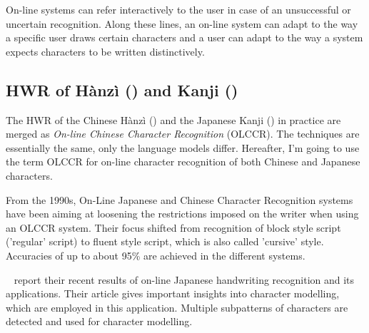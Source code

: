 On-line systems can refer interactively to the user in case of an unsuccessful 
or uncertain recognition. Along these lines, an on-line system can adapt to 
the way a specific user draws certain characters and a user can adapt to the
way a system expects characters to be written distinctively.

\subsection{HWR of Hànzì () and Kanji ()}
\label{sec:hwrofhanziandKanji}


The HWR of the Chinese Hànzì () and the Japanese Kanji () 
in practice are merged as \emph{On-line Chinese Character Recognition} (OLCCR). 
The techniques are essentially the same, only the language models differ. 
Hereafter, I'm going to use the term OLCCR for on-line character recognition of 
both Chinese and Japanese characters.

From the 1990s, On-Line Japanese and Chinese Character Recognition 
systems have been aiming at loosening the restrictions imposed on 
the writer when using an OLCCR system. Their focus shifted from recognition 
of block style script ('regular' script) to fluent style script, 
which is also called 'cursive' style. Accuracies of up to about 95\% are
achieved in the different systems.

~\citeyear{Nakagawa2008} report their recent results of on-line Japanese 
handwriting recognition and its applications. Their article gives 
important insights into character modelling, which are employed in 
this application. Multiple subpatterns of characters are detected and used for
character modelling.


